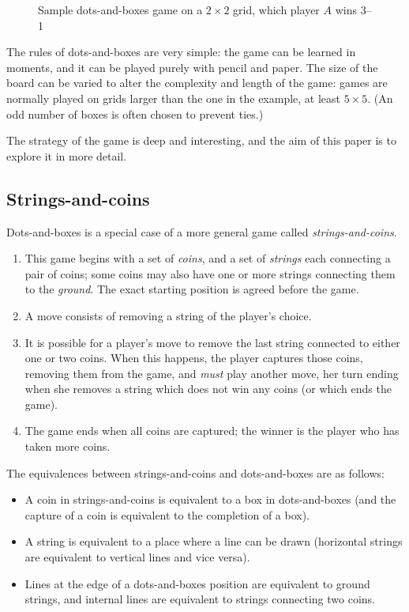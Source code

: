 \documentclass[a4paper,twocolumn]{article}
\begin{document}
\begin{figure*}
  \centering
  \def\svgscale{0.7}
  
  \caption{Sample dots-and-boxes game on a $2 \times 2$ grid, which
    player $A$ wins 3--1}
  \label{sampledab}
\end{figure*}

The rules of dots-and-boxes are very simple: the game can be learned
in moments, and it can be played purely with pencil and paper. The
size of the board can be varied to alter the complexity and length of
the game: games are normally played on grids larger than the one in
the example, at least $5 \times 5$. (An odd number of boxes is often
chosen to prevent ties.)

The strategy of the game is deep and interesting, and the aim of this
paper is to explore it in more detail.

\subsection{Strings-and-coins}

Dots-and-boxes is a special case of a more general game called
\emph{strings-and-coins}.

\begin{enumerate}
  \item This game begins with a set of \emph{coins}, and a set of
    \emph{strings} each connecting a pair of coins; some coins may
    also have one or more strings connecting them to the
    \emph{ground}. The exact starting position is agreed before the
    game.
  \item A move consists of removing a string of the player's choice.
  \item It is possible for a player's move to remove the last string
    connected to either one or two coins. When this happens, the
    player captures those coins, removing them from the game, and
    \emph{must} play another move, her turn ending when she removes a
    string which does not win any coins (or which ends the game).
  \item The game ends when all coins are captured; the winner is the
    player who has taken more coins.
\end{enumerate}

The equivalences between strings-and-coins and dots-and-boxes are as
follows:

\begin{itemize}
\item A coin in strings-and-coins is equivalent to a box in
  dots-and-boxes (and the capture of a coin is equivalent to the
  completion of a box).
\item A string is equivalent to a place where a line can be drawn
  (horizontal strings are equivalent to vertical lines and vice
  versa).
\item Lines at the edge of a dots-and-boxes position are equivalent to
  ground strings, and internal lines are equivalent to strings
  connecting two coins.
\end{itemize}
\end{document}
